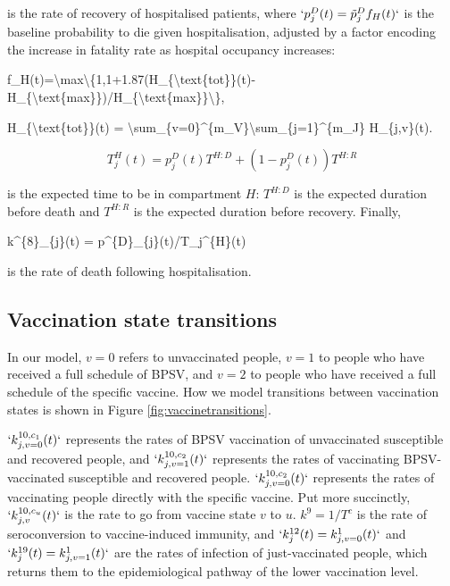\documentclass[
]{article}
\newenvironment{Shaded}{\begin{snugshade}}{\end{snugshade}}
\newcommand{\NormalTok}[1]{#1}
\begin{document}
is the rate of recovery of hospitalised patients, where \(`p^{D}_{j}(t)=\tilde{p}^{D}_{j}f_H(t)`\) is the baseline probability to die given hospitalisation, adjusted by a factor encoding the increase in fatality rate as hospital occupancy increases:

\begin{Shaded}
\begin{Highlighting}[]
\NormalTok{f\_H(t)=\textbackslash{}max\textbackslash{}\{1,1+1.87(H\_\{\textbackslash{}text\{tot\}\}(t){-}H\_\{\textbackslash{}text\{max\}\})/H\_\{\textbackslash{}text\{max\}\}\textbackslash{}\},}
\end{Highlighting}
\end{Shaded}

\begin{Shaded}
\begin{Highlighting}[]
\NormalTok{H\_\{\textbackslash{}text\{tot\}\}(t) = \textbackslash{}sum\_\{v=0\}\^{}\{m\_V\}\textbackslash{}sum\_\{j=1\}\^{}\{m\_J\} H\_\{j,v\}(t).}
\end{Highlighting}
\end{Shaded}

\[T_j^{H}(t) = p_j^{D}(t)T^{H:D} + (1-p_{j}^{D}(t))T^{H:R}\]

is the expected time to be in compartment \(H\): \(T^{H:D}\) is the expected duration before death and \(T^{H:R}\) is the expected duration before recovery. Finally,

\begin{Shaded}
\begin{Highlighting}[]
\NormalTok{k\^{}\{8\}\_\{j\}(t) = p\^{}\{D\}\_\{j\}(t)/T\_j\^{}\{H\}(t)}
\end{Highlighting}
\end{Shaded}

is the rate of death following hospitalisation.

\subsection{Vaccination state transitions}\label{vaccination-state-transitions}

In our model, \(v=0\) refers to unvaccinated people, \(v=1\) to people who have received a full schedule of BPSV, and \(v=2\) to people who have received a full schedule of the specific vaccine. How we model transitions between vaccination states is shown in Figure \ref{fig:vaccinetransitions}.

\(`k^{10,c_1}_{j,v=0}(t)`\) represents the rates of BPSV vaccination of unvaccinated susceptible and recovered people, and \(`k^{10,c_2}_{j,v=1}(t)`\) represents the rates of vaccinating BPSV-vaccinated susceptible and recovered people. \(`k^{10,c_2}_{j,v=0}(t)`\) represents the rates of vaccinating people directly with the specific vaccine. Put more succinctly, \(`k^{10,c_u}_{j,v}(t)`\) is the rate to go from vaccine state \(v\) to \(u\). \(k^9=1/T^c\) is the rate of seroconversion to vaccine-induced immunity, and \(`k^{12}_{j}(t)=k^{1}_{j,v=0}(t)`\) and \(`k^{19}_{j}(t)=k^{1}_{j,v=1}(t)`\) are the rates of infection of just-vaccinated people, which returns them to the epidemiological pathway of the lower vaccination level.
\end{document}

